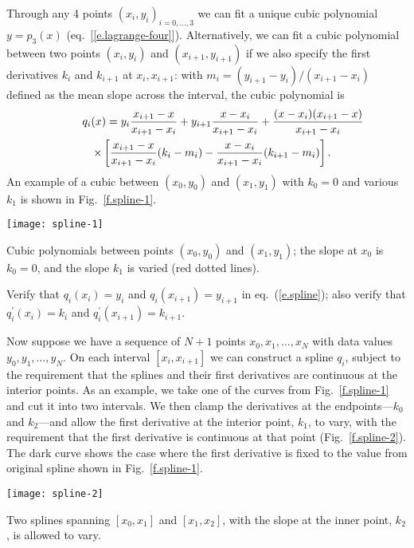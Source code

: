 Through any 4 points $(x_{i},y_{i})_{i=0,\ldots,3}$ we can fit a unique cubic polynomial $y=p_{3}(x)$ (eq.~[\ref{e.lagrange-four}]).  Alternatively, we can fit a cubic polynomial between two points $(x_{i},y_{i})$ and $(x_{i+1},y_{i+1})$ if we also specify the first derivatives $k_{i}$ and $k_{i+1}$ at $x_{i},x_{i+1}$: with $m_{i} = (y_{i+1}-y_{i})/(x_{i+1}-x_{i})$ defined as the mean slope across the interval, the cubic polynomial is
\begin{eqnarray}
\lefteqn{q_{i}(x) =   y_{i}\frac{x_{i+1}-x}{x_{i+1}-x_{i}} 
		   + y_{i+1}\frac{x-x_{i}}{x_{i+1}-x_{i}}
		   + \frac{(x-x_{i})(x_{i+1}-x)}{x_{i+1}-x_{i}}} && \nonumber\\
		   && \times\left[\frac{x_{i+1}-x}{x_{i+1}-x_{i}}(k_{i}-m_{i})
		       -\frac{x-x_{i}}{x_{i+1}-x_{i}}(k_{i+1}-m_{i})\right].
\label{e.spline}
\end{eqnarray}
An example of a cubic between $(x_{0},y_{0})$ and $(x_{1},y_{1})$ with $k_{0}=0$ and various $k_{1}$ is shown in Fig.~\ref{f.spline-1}.
\begin{marginfigure}[-16\baselineskip]
\texttt{[image: spline-1]}
\caption[Cubic polynomial with varying right-hand slopes]{\label{f.spline-1}Cubic polynomials between points $(x_{0},y_{0})$ and $(x_{1},y_{1})$; the slope at $x_{0}$ is $k_{0}=0$, and the slope $k_{1}$ is varied (red dotted lines).}
\end{marginfigure}

\begin{exercisebox}
Verify that $q_{i}(x_{i}) = y_{i}$ and $q_{i}(x_{i+1}) = y_{i+1}$ in eq.~(\ref{e.spline}); also verify that $q^{\prime}_{i}(x_{i}) = k_{i}$ and $q^{\prime}_{i}(x_{i+1}) = k_{i+1}$.
\end{exercisebox}

Now suppose we have a sequence of $N+1$ points $x_{0},x_{1},\ldots,x_{N}$ with data values $y_{0},y_{1},\ldots,y_{N}$. On each interval $[x_{i},x_{i+1}]$ we can construct a spline $q_{i}$, subject to the requirement that the splines and their first derivatives are continuous at the interior points. As an example, we take one of the curves from Fig.~\ref{f.spline-1} and cut it into two intervals. We then clamp the derivatives at the endpoints---$k_{0}$ and $k_{2}$---and allow the first derivative at the interior point, $k_{1}$, to vary, with the requirement that the first derivative is continuous at that point (Fig.~\ref{f.spline-2}). The dark curve shows the case where the first derivative is fixed to the value from original spline shown in Fig.~\ref{f.spline-1}.
\begin{marginfigure}[-8\baselineskip]
\texttt{[image: spline-2]}
\caption[Two splines connected at an interior point]{\label{f.spline-2} Two splines spanning $[x_{0},x_{1}]$ and $[x_{1},x_{2}]$, with the slope at the inner point, $k_{2}$, is allowed to vary.}
\end{marginfigure}

